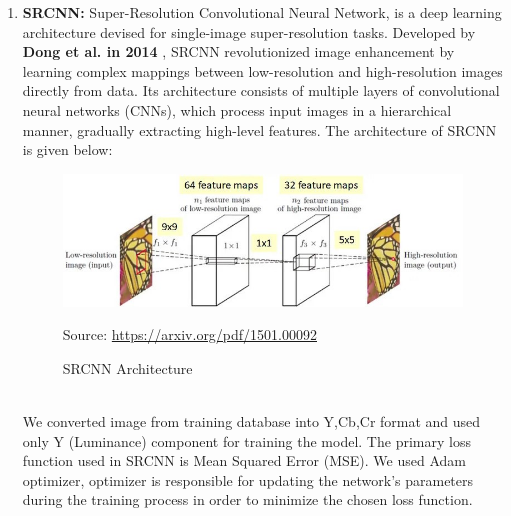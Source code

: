 \begin{enumerate}[label=(\roman*)]
    \item {\bf SRCNN:} Super-Resolution Convolutional Neural Network, is a deep learning architecture devised for single-image super-resolution tasks. Developed by {\bf Dong et al. in 2014} \cite{r2}, SRCNN revolutionized image enhancement by learning complex mappings between low-resolution and high-resolution images directly from data. Its architecture consists of multiple layers of convolutional neural networks (CNNs), which process input images in a hierarchical manner, gradually extracting high-level features. The architecture of SRCNN is given below:
    \begin{figure}[ht]
        \centering
        \includegraphics[width=5in]{./figures/srcnn.jpg}
        \caption{SRCNN Architecture}
        \par  Source: \url{https://arxiv.org/pdf/1501.00092}
    \end{figure} \\
    We converted image from training database into Y,Cb,Cr format and used only Y (Luminance) component for training the model. The primary loss function used in SRCNN is Mean Squared Error (MSE). We used Adam optimizer, optimizer is responsible for updating the network's parameters during the training process in order to minimize the chosen loss function.


\end{enumerate}
